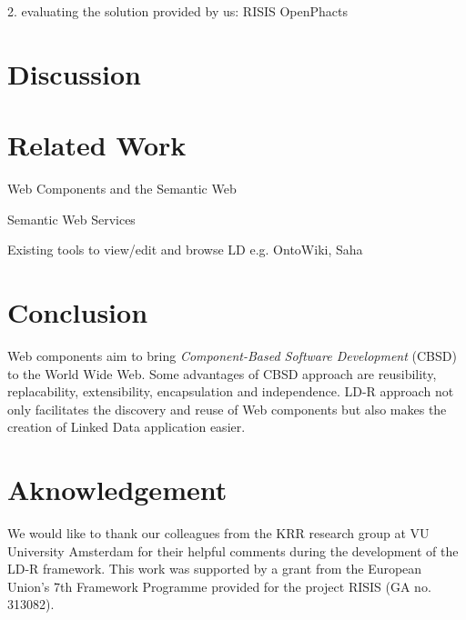 \documentclass{acm_proc_article-sp}
\begin{document}
2. evaluating the solution provided by us:
RISIS
OpenPhacts

\section{Discussion}

\section{Related Work}

Web Components and the Semantic Web~\cite{pahl2011}

Semantic Web Services

Existing tools to view/edit and browse LD e.g. OntoWiki, Saha

\section{Conclusion}
Web components aim to bring \emph{Component-Based Software Development} (CBSD) to the World Wide Web.
Some advantages of CBSD approach are reusibility, replacability, extensibility, encapsulation and independence.
LD-R approach not only facilitates the discovery and reuse of Web components but also makes the creation of Linked Data application easier.

\section{Aknowledgement}
We would like to thank our colleagues from the KRR research group at VU University Amsterdam for their helpful comments during the development of the LD-R framework. This work was supported by a grant from the European Union's 7th Framework Programme provided for the project RISIS (GA no. 313082).




\end{document}
